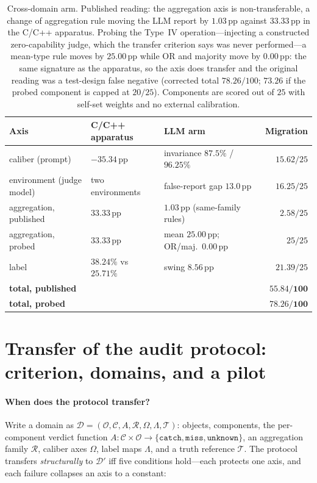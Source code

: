 \documentclass{article}
\newcommand{\catch}{\texttt{catch}}
\newcommand{\miss}{\texttt{miss}}
\newcommand{\unk}{\texttt{unknown}}
\newcommand{\pp}{\,\mathrm{pp}}
\begin{document}
\begin{table}[t]
\centering
\small
\caption{Cross-domain arm. Published reading: the aggregation axis is non-transferable, a change of
aggregation rule moving the LLM report by $1.03\pp$ against $33.33\pp$ in the C/C++ apparatus. Probing the
Type~IV operation---injecting a constructed zero-capability judge, which the transfer criterion says was
never performed---a mean-type rule moves by $25.00\pp$ while OR and majority move by $0.00\pp$: the same
signature as the apparatus, so the axis does transfer and the original reading was a test-design false
negative (corrected total $78.26/100$; $73.26$ if the probed component is capped at $20/25$). Components are
scored out of $25$ with self-set weights and no external calibration.}
\label{tab:crossdomain}
\begin{tabular}{@{}p{2.5cm} p{3.8cm} p{4.2cm} r@{}}
\toprule
Axis & C/C++ apparatus & LLM arm & Migration \\
\midrule
caliber (prompt) & $-35.34\pp$ & invariance $87.5\%$ / $96.25\%$ & $15.62/25$ \\
environment (judge model) & two environments & false-report gap $13.0\pp$ & $16.25/25$ \\
aggregation, published & $33.33\pp$ & $1.03\pp$ (same-family rules) & $2.58/25$ \\
aggregation, probed & $33.33\pp$ & mean $25.00\pp$; OR/maj.\ $0.00\pp$ & $25/25$ \\
label & $38.24\%$ vs $25.71\%$ & swing $8.56\pp$ & $21.39/25$ \\
\midrule
\textbf{total, published} & & & $\mathbf{55.84/100}$ \\
\textbf{total, probed} & & & $\mathbf{78.26/100}$ \\
\bottomrule
\end{tabular}
\end{table}



\section{Transfer of the audit protocol: criterion, domains, and a pilot}
\label{app:transfer}

\paragraph{When does the protocol transfer?} Write a domain as
$\mathcal{D}=(\mathcal{O},\mathcal{C},A,\mathcal{R},\Omega,\Lambda,\mathcal{T})$: objects, components, the
per-component verdict function $A:\mathcal{C}\times\mathcal{O}\to\{\catch,\miss,\unk\}$, an aggregation
family $\mathcal{R}$, caliber axes $\Omega$, label maps $\Lambda$, and a truth reference $\mathcal{T}$. The
protocol transfers \emph{structurally} to $\mathcal{D}'$ iff five conditions hold---each protects one axis,
and each failure collapses an axis to a constant:
\end{document}
